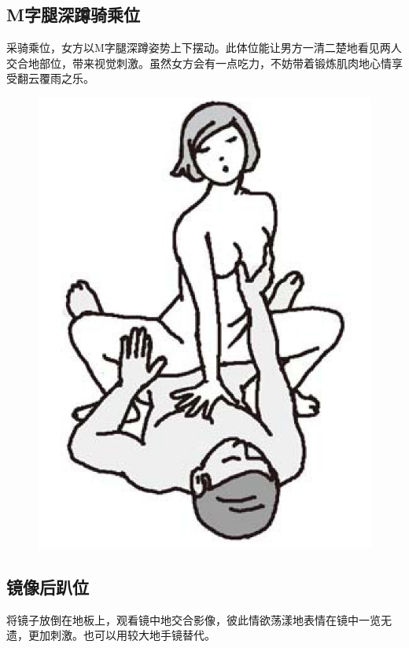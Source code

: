 \documentclass[12pt,UTF8]{ctexbook}
\begin{document}
\subsection{M字腿深蹲骑乘位}

采骑乘位，女方以M字腿深蹲姿势上下摆动。此体位能让男方一清二楚地看见两人交合地部位，带来视觉刺激。虽然女方会有一点吃力，不妨带着锻炼肌肉地心情享受翻云覆雨之乐。

\begin{figure}[htbp]
\centering
\includegraphics[width=0.7\linewidth]{tw29}
\caption{}
\label{fig:1}
\end{figure}

\subsection{镜像后趴位}

将镜子放倒在地板上，观看镜中地交合影像，彼此情欲荡漾地表情在镜中一览无遗，更加刺激。也可以用较大地手镜替代。
\end{document}

